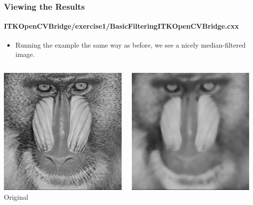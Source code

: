 \begin{frame}
\frametitle{Viewing the Results}
\framesubtitle{ITKOpenCVBridge/exercise1/BasicFilteringITKOpenCVBridge.cxx}
\begin{itemize}
\item Running the example the same way as before, we see a nicely
median-filtered image.
\end{itemize}
\begin{columns}[c]
\begin{center}
\includegraphics[width=1\textwidth]{../Art/mandrilgray.png} \\
Original
\end{center}
\begin{center}
\includegraphics[width=1\textwidth]{../Art/OpenCVITKex1.png} \\

\end{center}
\end{columns}
\end{frame}
